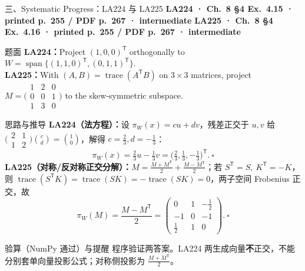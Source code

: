 \documentclass[aspectratio=169,10pt,fontset=none]{ctexbeamer}
\newcommand{\ex}[1]{\textcolor{accent}{\footnotesize\bfseries #1}}
\begin{document}
\begin{frame}[t]{三、Systematic Progress：LA224 与 LA225}
  \leavevmode\ex{LA224 · Ch.~8 §4 Ex.~4.15 · printed p.~255 / PDF p.~267 · intermediate}\quad
  \ex{LA225 · Ch.~8 §4 Ex.~4.16 · printed p.~255 / PDF p.~267 · intermediate}
  \begin{block}{\footnotesize 题面}
    \scriptsize \textbf{LA224：}Project $(1,0,0)^{\mathsf T}$ orthogonally to $W=\operatorname{span}\{(1,1,0)^{\mathsf T},(0,1,1)^{\mathsf T}\}$.\\
    \textbf{LA225：}With $(A,B)=\operatorname{trace}(A^{\mathsf T}B)$ on $3\times3$ matrices, project $M=\bigl(\begin{smallmatrix}1&2&0\\0&0&1\\1&3&0\end{smallmatrix}\bigr)$ to the skew-symmetric subspace.
  \end{block}
  \begin{exampleblock}{\footnotesize 思路与推导}
    \scriptsize
    \textbf{LA224（法方程）：}设 $\pi_W(x)=cu+dv$，残差正交于 $u,v$ 给 $\bigl(\begin{smallmatrix}2&1\\1&2\end{smallmatrix}\bigr)\binom cd=\binom10$，解得 $c=\tfrac23,d=-\tfrac13$：
    $$\pi_W(x)=\tfrac23u-\tfrac13v=\bigl(\tfrac23,\tfrac13,-\tfrac13\bigr)^{\mathsf T}.\ \square$$
    \textbf{LA225（对称/反对称正交分解）：}$M=\tfrac{M+M^{\mathsf T}}2+\tfrac{M-M^{\mathsf T}}2$；若 $S^{\mathsf T}=S,\ K^{\mathsf T}=-K$，则 $\operatorname{trace}(S^{\mathsf T}K)=\operatorname{trace}(SK)=-\operatorname{trace}(SK)=0$，两子空间 Frobenius 正交，故
    $$\pi_W(M)=\frac{M-M^{\mathsf T}}2=\begin{pmatrix}0&1&-\tfrac12\\-1&0&-1\\\tfrac12&1&0\end{pmatrix}.\ \square$$
  \end{exampleblock}
  \begin{block}{\footnotesize 验算（NumPy 通过）与提醒}
    \scriptsize 程序验证两答案。LA224 两生成向量\textbf{不}正交，不能分别套单向量投影公式；对称侧投影为 $\tfrac{M+M^{\mathsf T}}2$。
  \end{block}
\end{frame}
\end{document}
